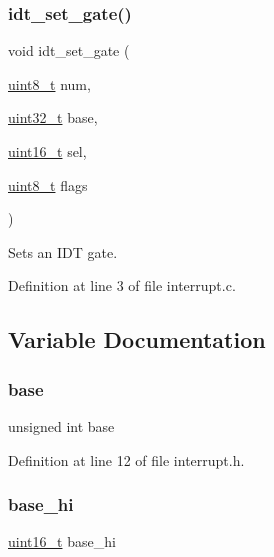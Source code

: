 \subsubsection{\texorpdfstring{idt\+\_\+set\+\_\+gate()}{idt\_set\_gate()}}
{\footnotesize\ttfamily void idt\+\_\+set\+\_\+gate (\begin{DoxyParamCaption}\item[{\hyperlink{a00032_aba7bc1797add20fe3efdf37ced1182c5_aba7bc1797add20fe3efdf37ced1182c5}{uint8\+\_\+t}}]{num,  }\item[{\hyperlink{a00032_a435d1572bf3f880d55459d9805097f62_a435d1572bf3f880d55459d9805097f62}{uint32\+\_\+t}}]{base,  }\item[{\hyperlink{a00032_a273cf69d639a59973b6019625df33e30_a273cf69d639a59973b6019625df33e30}{uint16\+\_\+t}}]{sel,  }\item[{\hyperlink{a00032_aba7bc1797add20fe3efdf37ced1182c5_aba7bc1797add20fe3efdf37ced1182c5}{uint8\+\_\+t}}]{flags }\end{DoxyParamCaption})}



Sets an I\+DT gate. 



Definition at line 3 of file interrupt.\+c.



\subsection{Variable Documentation}
\mbox{\label{a00017_a2e013c2c6e8010c8116c6f56813df57b_a2e013c2c6e8010c8116c6f56813df57b}} 
\subsubsection{\texorpdfstring{base}{base}}
{\footnotesize\ttfamily unsigned int base}



Definition at line 12 of file interrupt.\+h.

\mbox{\label{a00017_af85e6d5e4292b0c25c18f701e61d51fa_af85e6d5e4292b0c25c18f701e61d51fa}} 
\subsubsection{\texorpdfstring{base\+\_\+hi}{base\_hi}}
{\footnotesize\ttfamily \hyperlink{a00032_a273cf69d639a59973b6019625df33e30_a273cf69d639a59973b6019625df33e30}{uint16\+\_\+t} base\+\_\+hi}



